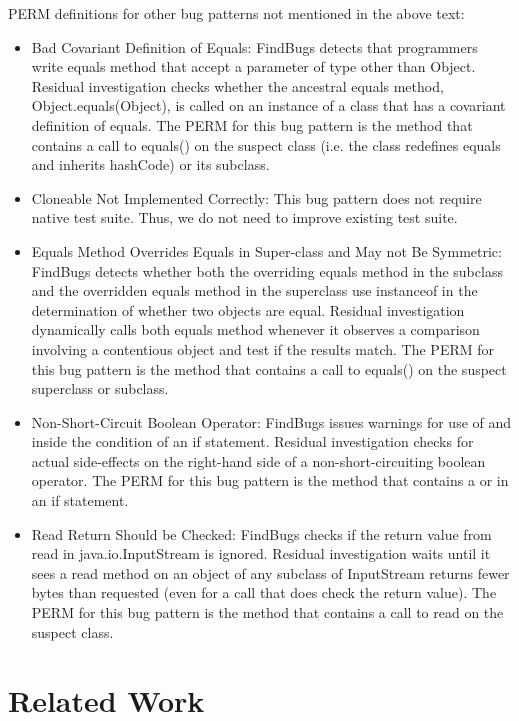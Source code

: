 \documentclass[proposal]{umthesis} %
\begin{document}
PERM definitions for other bug patterns not mentioned in the above text:
\begin{itemize}
\item Bad Covariant Definition of Equals: FindBugs detects that programmers write equals method that accept a parameter of type other than Object.  Residual investigation checks whether the ancestral equals method, Object.equals(Object), is called on an instance of a class that has a covariant definition of equals.  The PERM for this bug pattern is the method that contains a call to equals() on the suspect class (i.e. the class redefines equals and inherits hashCode) or its subclass.
\item Cloneable Not Implemented Correctly: This bug pattern does not require native test suite.  Thus, we do not need to improve existing test suite.
\item Equals Method Overrides Equals in Super-class and May not Be Symmetric: FindBugs detects whether both the overriding equals method in the subclass and the overridden equals method in the superclass use instanceof in the determination of whether two objects are equal.  Residual investigation dynamically calls both equals method whenever it observes a comparison involving a contentious object and test if the results match.  The PERM for this bug pattern is the method that contains a call to equals() on the suspect superclass or subclass.
\item Non-Short-Circuit Boolean Operator: FindBugs issues warnings for use of \sv{\&} and \sv{|} inside the condition of an if statement.  Residual investigation checks for actual side-effects on the right-hand side of a non-short-circuiting boolean operator.  The PERM for this bug pattern is the method that contains a \sv{\&} or \sv{|} in an if statement.
\item Read Return Should be Checked: FindBugs checks if the return value from read in java.io.InputStream is ignored.  Residual investigation waits until it sees a read method on an object of any subclass of InputStream returns fewer bytes than requested (even for a call that does check the return value).  The PERM for this bug pattern is the method that contains a call to read on the suspect class.
\end{itemize}

\chapter{Related Work}
\label{chp:related}
\end{document}
